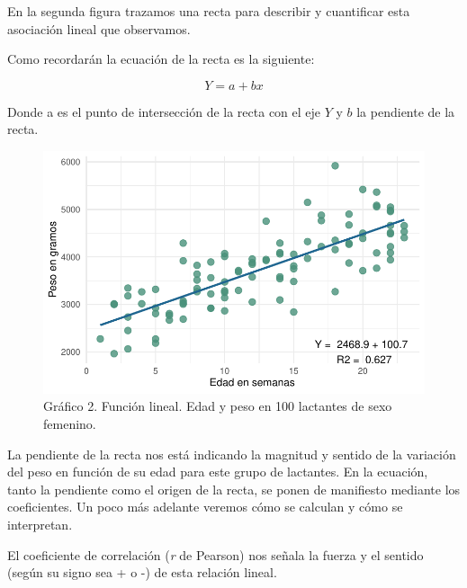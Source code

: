\documentclass[
  letterpaper,
  DIV=11,
  numbers=noendperiod]{scrartcl}
\begin{document}
En la segunda figura trazamos una recta para describir y cuantificar
esta asociación lineal que observamos.

Como recordarán la ecuación de la recta es la siguiente:

\[Y = a + bx\]

Donde a es el punto de intersección de la recta con el eje \(Y\) y \(b\)
la pendiente de la recta.

\begin{figure}[H]

{\centering \includegraphics{index_files/figure-pdf/unnamed-chunk-5-1.pdf}

}

\caption{Gráfico 2. Función lineal. Edad y peso en 100 lactantes de sexo
femenino.}

\end{figure}%

La pendiente de la recta nos está indicando la magnitud y sentido de la
variación del peso en función de su edad para este grupo de lactantes.
En la ecuación, tanto la pendiente como el origen de la recta, se ponen
de manifiesto mediante los coeficientes. Un poco más adelante veremos
cómo se calculan y cómo se interpretan.

\begin{tcolorbox}[enhanced jigsaw, toptitle=1mm, colbacktitle=quarto-callout-tip-color!10!white, opacitybacktitle=0.6, leftrule=.75mm, rightrule=.15mm, title=\textcolor{quarto-callout-tip-color}{\faLightbulb}\hspace{0.5em}{Nota}, colframe=quarto-callout-tip-color-frame, breakable, coltitle=black, bottomrule=.15mm, opacityback=0, left=2mm, titlerule=0mm, bottomtitle=1mm, toprule=.15mm, colback=white, arc=.35mm]

El coeficiente de correlación (\emph{r} de Pearson) nos señala la fuerza
y el sentido (según su signo sea + o -) de esta relación lineal.

\end{tcolorbox}
\end{document}
